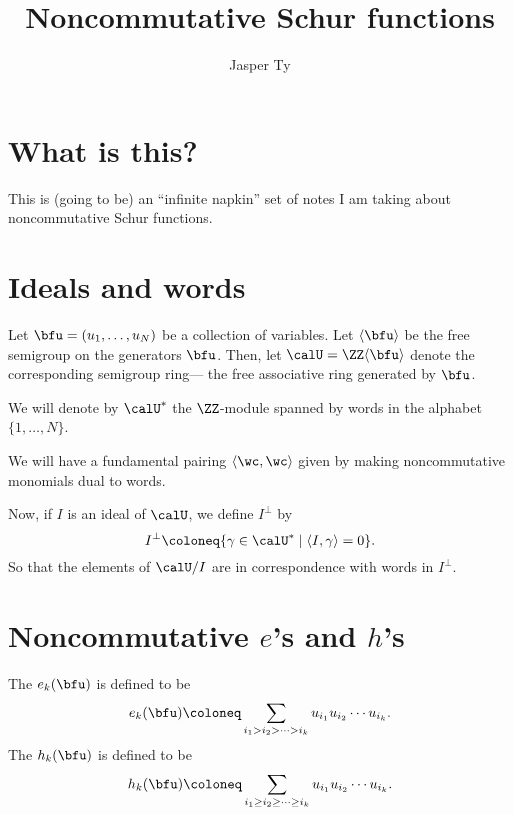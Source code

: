 \documentclass{article}
\title{Noncommutative Schur functions}
\author{Jasper Ty}
\date{}
\newcommand{\ip}[1]{
    \left\langle
        {#1}
    \right\rangle
}
\begin{document}
\maketitle

\section*{What is this?}

This is (going to be) an ``infinite napkin'' set of notes I am taking about noncommutative Schur functions.

\tableofcontents

\newpage

\section{Ideals and words}

Let $\bfu = (u_1,\ldots,u_N)$ be a collection of variables.
Let $\langle \bfu \rangle$ be the free semigroup on the generators $\bfu$.
Then, let $\calU = \ZZ\langle\bfu\rangle$ denote the corresponding semigroup ring--- the free associative ring generated by $\bfu$.

We will denote by $\calU^\ast$ the $\ZZ$-module spanned by words in the alphabet $\{1,\ldots,N\}$.

We will have a fundamental pairing $\ip{\wc,\wc}$ given by making noncommutative monomials dual to words.

Now, if $I$ is an ideal of $\calU$, we define $I^\perp$ by
\[
    I^\perp
    \coloneq
    \{
        \gamma \in \calU^\ast
        \mid
        \ip{I, \gamma} = 0
    \}.
\]
So that the elements of $\calU/I$ are in correspondence with words in $I^\perp$.

\section{
    Noncommutative 
    \texorpdfstring{$e$}{e}'s
    and
    \texorpdfstring{$h$}{h}'s
}

\begin{definition}
    The  $e_k(\bfu)$ is defined to be
    \[
        e_k(\bfu)
        \coloneq
        \sum_{i_1 > i_2 > \cdots > i_k}
        u_{i_1} u_{i_2} \cdots u_{i_k}. 
    \]
    The  $h_k(\bfu)$ is defined to be
    \[
        h_k(\bfu)
        \coloneq
        \sum_{i_1 \geq i_2 \geq \cdots \geq i_k}
        u_{i_1} u_{i_2} \cdots u_{i_k}. 
    \]
\end{definition}
\end{document}
